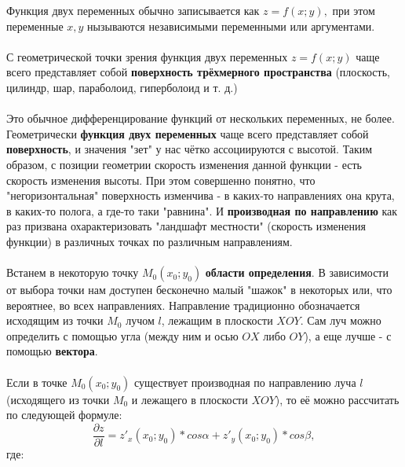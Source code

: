 \documentclass[14pt, letterpaper]{article}
\begin{document}
Функция двух переменных обычно записывается как $z = f(x; y),$ при этом переменные $x, y$ нызываются независимыми переменными или аргументами.

\paragraph{}
С геометрической точки зрения функция двух переменных $z = f(x; y)$ чаще всего представляет собой \textbf{поверхность трёхмерного пространства} (плоскость, цилиндр, шар, параболоид, гиперболоид и т. д.)

\paragraph{}
Это обычное дифференцирование функций от нескольких переменных, не более. Геометрически \textbf{функция двух переменных} чаще всего представляет собой \textbf{поверхность}, и значения "зет" у нас чётко ассоциируются с высотой. Таким образом, с позиции геометрии скорость изменения данной функции  - есть скорость изменения высоты. При этом совершенно понятно, что "негоризонтальная" поверхность изменчива - в каких-то направлениях она крута, в каких-то полога, а где-то таки "равнина". И \textbf{производная по направлению} как раз призвана охарактеризовать "ландшафт местности" (скорость изменения функции) в различных точках по различным направлениям.


\paragraph{}
Встанем в некоторую точку $M_{0}(x_{0}; y_{0})$ \textbf{области определения}. В зависимости от выбора точки нам доступен бесконечно малый "шажок" в некоторых или, что вероятнее, во всех направлениях. Направление традиционно обозначается исходящим из точки $M_{0}$ лучом $l$, лежащим в плоскости $XOY$. Сам луч можно определить с помощью угла (между ним и осью $OX$ либо $OY$), а еще лучше - с помощью \textbf{вектора}.

\paragraph{}
Если в точке $M_{0}(x_{0}; y_{0})$ существует производная по направлению луча $l$ (исходящего из точки $M_{0}$ и лежащего в плоскости $XOY$), то её можно рассчитать по следующей формуле:
$$\frac{\partial z}{\partial l} = z\prime_{x}(x_{0}; y_{0})*cos\alpha + z\prime_{y}(x_{0}; y_{0})*cos\beta, $$
где:
\end{document}

